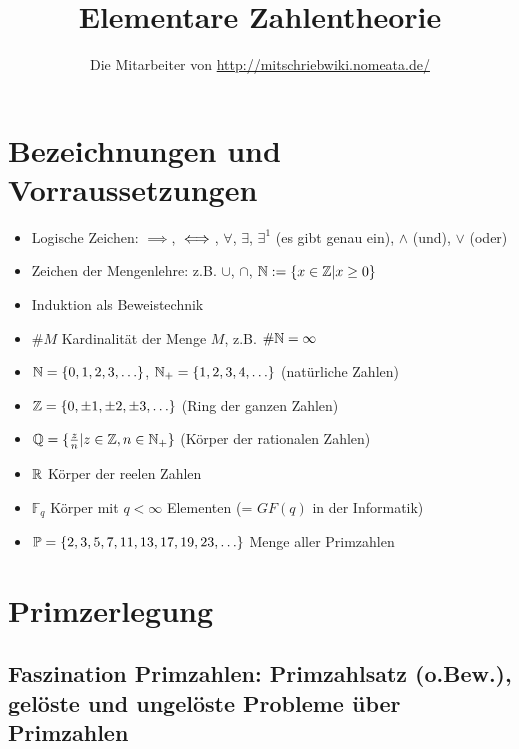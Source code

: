 \documentclass[a4paper,twoside,DIV15,BCOR12mm]{scrbook}
\author{Die Mitarbeiter von \url{http://mitschriebwiki.nomeata.de/}}
\title{Elementare Zahlentheorie}
\begin{document}
\maketitle

\renewcommand{\thechapter}{\roman{chapter}}
 \tableofcontents


\chapter*{Bezeichnungen und Vorraussetzungen}
\begin{itemize}
\item Logische Zeichen: $\implies$, $\iff$, $\forall$, $\exists$, $\exists^1$ (es gibt genau ein), $\wedge$ (und), $\vee$ (oder)
\item Zeichen der Mengenlehre: z.B. $\cup$, $\cap$, $\mathbb{N} := \{x\in \mathbb{Z}| x \ge 0 \}$
\item Induktion als Beweistechnik
\item $\#M$ Kardinalität der Menge $M$, z.B. $\#\mathbb{N} = \infty$
\item $\mathbb{N} = \{0,1,2,3,\ldots\}$, $\mathbb{N}_+ = \{1,2,3,4,\ldots\}$ (natürliche Zahlen)
\item $\mathbb{Z} = \{0, \pm1, \pm2, \pm3, \ldots \}$ (Ring der ganzen Zahlen)
\item $\mathbb{Q} = \{\frac z n| z\in \mathbb{Z}, n\in \mathbb{N}_+\}$ (Körper der rationalen Zahlen)
\item $\mathbb{R}$ Körper der reelen Zahlen
\item $\mathbb{F}_q$ Körper mit $q<\infty$ Elementen (= $GF(q)$ in der Informatik)
\item $\mathbb{P} = \{ 2,3,5,7,11,13,17,19,23,\ldots\}$ Menge aller Primzahlen
\end{itemize}

\setcounter{chapter}{0}
\renewcommand{\thechapter}{\arabic{chapter}}

\chapter{Primzerlegung}

\section[Einführung und Motivation]{Faszination Primzahlen: Primzahlsatz (o.Bew.), gelöste
und ungelöste Probleme über Primzahlen}
\end{document}
